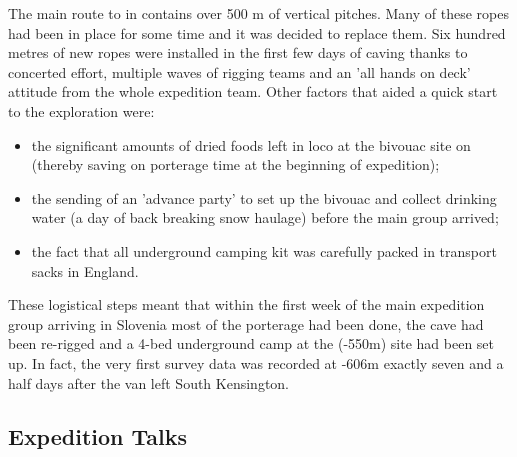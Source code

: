 The main route to  in  contains over 500
m of vertical pitches. Many of these ropes had been in place for some time and it was decided to replace them. Six hundred metres of new ropes were installed in the first few days of caving thanks to concerted effort, multiple waves of rigging teams and an 'all hands on deck' attitude
from the whole expedition team.  Other factors that aided a quick start to the
exploration were:



\begin{itemize}
\item the significant amounts of dried foods left in loco at the bivouac
site on  (thereby saving on porterage time at the beginning of expedition); 
\item the sending of an 'advance party' to set up the bivouac and collect drinking water (a day of back breaking snow haulage) before the main group arrived; 
\item the fact that all underground camping kit was carefully packed in transport sacks in \passage[town]England. 
\end{itemize}
These logistical steps meant that within the first week of the main expedition group arriving in Slovenia most of the porterage had been done, the cave had been re-rigged and a 4-bed underground camp at the  (-550m) site had been set up. In fact, the very first survey
data was recorded at -606m exactly seven and a half days after the van left \passage[town]South Kensington.


\subsection{Expedition Talks}

